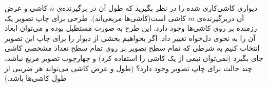 \EXERCISE
دیواری کاشی‌کاری شده را در نظر بگیرید که طول آن در برگیرنده‌ی
$n$
کاشی و عرض آن دربرگیرنده‌ی
$m$
کاشی است(کاشی‌ها مربعی‌اند). طرحی برای چاپ تصویر یک رزمنده بر روی کاشی‌ها وجود دارد. این طرح به صورت مستطیل بوده و می‌توان ابعاد آن را به نحوی دل‌خواه تغییر داد. اگر بخواهیم بخشی از دیوار را برای چاپ این تصویر انتخاب کنیم به شرطی که تمام سطح تصویر بر روی تمام سطح تعداد مشخصی کاشی جای بگیرد (نمی‌توان نیمی از یک کاشی را استفاده کرد) و چهارچوب تصویر مربع نباشد، چند حالت برای چاپ تصویر وجود دارد؟ (طول و عرض کاشی می‌تواند هر ضریبی از طول کاشی‌ها باشد.)
